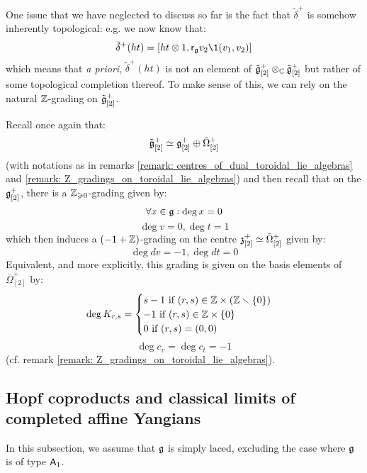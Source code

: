         \begin{remark} \label{remark: topological_toroidal_lie_bialgebras}
            One issue that we have neglected to discuss so far is the fact that $\tilde{\delta}^+$ is somehow inherently topological: e.g. we now know that:
                $$\tilde{\delta}^+(ht) = [ht \tensor 1, \sfr_{\g} v_2 \1(v_1, v_2)]$$
            which means that \textit{a priori}, $\tilde{\delta}^+(ht)$ is not an element of $\tilde{\g}_{[2]}^+ \tensor_{\bbC} \tilde{\g}_{[2]}^+$ but rather of some topological completion thereof. To make sense of this, we can rely on the natural $\mathbb{Z}$-grading on $\tilde{\mathfrak{g}}_{[2]}^+$.

            Recall once again that:
                $$\tilde{\mathfrak{g}}_{[2]}^+ \simeq \mathfrak{g}_{[2]}^+ \oplus \bar{\Omega}_{[2]}^+$$
            (with notations as in remarks \ref{remark: centres_of_dual_toroidal_lie_algebras} and \ref{remark: Z_gradings_on_toroidal_lie_algebras}) and then recall that on the $\mathfrak{g}_{[2]}^+$, there is a $\mathbb{Z}_{\geqslant 0}$-grading given by:
                $$\forall x \in \mathfrak{g}: \deg x = 0$$
                $$\deg v = 0, \deg t = 1$$
            which then induces a $(-1 + \mathbb{Z})$-grading on the centre $\mathfrak{z}_{[2]}^+ \simeq \bar{\Omega}_{[2]}^+$ given by:
                $$\deg dv = -1, \deg dt = 0$$
            Equivalent, and more explicitly, this grading is given on the basis elements of $\bar{\Omega}_{[2]}^+$ by:
                $$
                    \deg K_{r, s} =
                    \begin{cases}
                        \text{$s - 1$ if $(r, s) \in \Z \x (\Z \setminus \{0\})$}
                        \\
                        \text{$-1$ if $(r, s) \in \Z \x \{0\}$}
                        \\
                        \text{$0$ if $(r, s) = (0, 0)$}
                    \end{cases}
                $$
                $$\deg c_v = \deg c_t = -1$$
            (cf. remark \ref{remark: Z_gradings_on_toroidal_lie_algebras}). 

        \end{remark}
    
    \subsection{Hopf coproducts and classical limits of completed affine Yangians}
        \begin{convention}
            In this subsection, we assume that $\mathfrak{g}$ is simply laced, excluding the case where $\mathfrak{g}$ is of type $\mathsf{A}_1$. 
        \end{convention}

